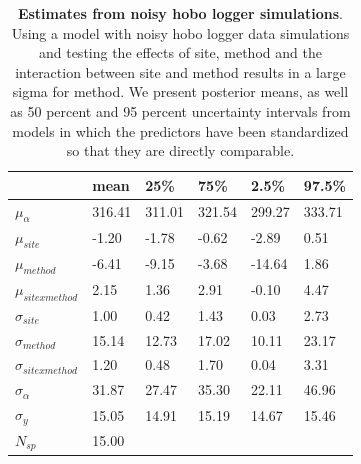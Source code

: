 \documentclass{article}\usepackage[]{graphicx}\usepackage[]{color}
\begin{document}
\begin{table}[ht]
\centering
\caption{\textbf{Estimates from noisy hobo logger simulations}. Using a model with noisy hobo logger data simulations and testing the effects of site, method and the interaction between site and method results in a large sigma for method. We present posterior means, as well as 50 percent and 95 percent uncertainty intervals from models in which the predictors have been standardized so that they are directly comparable.} 
\label{tab:noisyhobo}
\begingroup\footnotesize
\begin{tabular}{|p{}|p{}p{}p{}p{}p{}|}
  \hline
 & mean & 25\% & 75\% & 2.5\% & 97.5\% \\ 
  \hline
$\mu_{\alpha}$ & 316.41 & 311.01 & 321.54 & 299.27 & 333.71 \\ 
  $\mu_{site}$ & -1.20 & -1.78 & -0.62 & -2.89 & 0.51 \\ 
  $\mu_{method}$ & -6.41 & -9.15 & -3.68 & -14.64 & 1.86 \\ 
  $\mu_{sitexmethod}$ & 2.15 & 1.36 & 2.91 & -0.10 & 4.47 \\ 
  $\sigma_{site}$ & 1.00 & 0.42 & 1.43 & 0.03 & 2.73 \\ 
  $\sigma_{method}$ & 15.14 & 12.73 & 17.02 & 10.11 & 23.17 \\ 
  $\sigma_{sitexmethod}$ & 1.20 & 0.48 & 1.70 & 0.04 & 3.31 \\ 
  $\sigma_{\alpha}$ & 31.87 & 27.47 & 35.30 & 22.11 & 46.96 \\ 
  $\sigma_{y}$ & 15.05 & 14.91 & 15.19 & 14.67 & 15.46 \\ 
   \hline
$N_{sp}$ & 15.00 &  &  &  &  \\ 
   \hline
\end{tabular}
\endgroup
\end{table}
\end{document}
